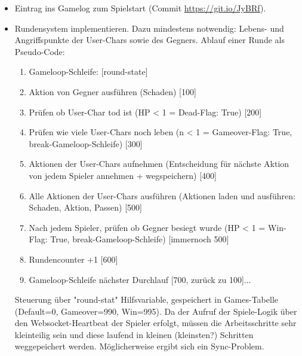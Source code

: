 \begin{itemize}
    \item Eintrag ins Gamelog zum Spielstart (Commit \url{https://git.io/JyBRf}).
    \item Rundensystem implementieren. Dazu mindestens notwendig: Lebens- und Angriffspunkte der User-Chars sowie des Gegners. Ablauf einer Runde als Pseudo-Code: 
    \begin{enumerate}
        \item Gameloop-Schleife: [round-state]
        \item Aktion von Gegner ausführen (Schaden) [100]
        \item Prüfen ob User-Char tod ist (HP < 1 = Dead-Flag: True) [200]
        \item Prüfen wie viele User-Chars noch leben (n < 1 = Gameover-Flag: True, break-Gameloop-Schleife) [300]
        \item Aktionen der User-Chars aufnehmen (Entscheidung für nächste Aktion von jedem Spieler annehmen + wegspeichern) [400]
        \item Alle Aktionen der User-Chars ausführen (Aktionen laden und ausführen: Schaden, Aktion, Passen) [500]
        \item Nach jedem Spieler, prüfen ob Gegner besiegt wurde (HP < 1 = Win-Flag: True, break-Gameloop-Schleife) [immernoch 500]
        \item Rundencounter +1 [600]
        \item Gameloop-Schleife nächster Durchlauf [700, zurück zu 100]...
    \end{enumerate}
    Steuerung über "round-stat" Hilfsvariable, gespeichert in Games-Tabelle (Default=0, Gameover=990, Win=995). Da der Aufruf der Spiele-Logik über den Websocket-Heartbeat der Spieler erfolgt, müssen die Arbeitsschritte sehr kleinteilig sein und diese laufend in kleinen (kleinsten?) Schritten weggepeichert werden. Möglicherweise ergibt sich ein Sync-Problem.
\end{itemize}

